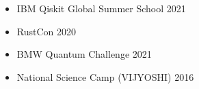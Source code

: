 \vspace*{-0.4 cm}
\begin{multicols}{2}\raggedright %
    \begin{itemize}
        \item[\circ] IBM Qiskit Global Summer School 2021
        \item[\circ] RustCon 2020 
       
      \end{itemize}
  \columnbreak
  
  \begin{itemize}
    \item[\circ] BMW Quantum Challenge 2021
   
    \item[\circ] National Science Camp (VIJYOSHI) 2016 
  \end{itemize}
  \columnbreak
  
\end{multicols}